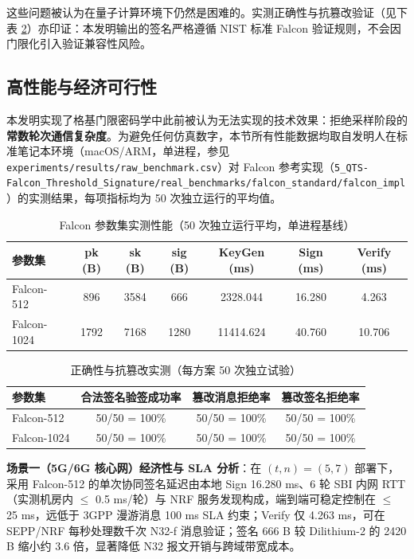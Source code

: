 \documentclass[12pt,a4paper]{article}
\begin{document}
这些问题被认为在量子计算环境下仍然是困难的。实测正确性与抗篡改验证（见下表 \ref{tab:correctness}）亦印证：本发明输出的签名严格遵循 NIST 标准 Falcon 验证规则，不会因门限化引入验证兼容性风险。

\subsection{高性能与经济可行性}

本发明实现了格基门限密码学中此前被认为无法实现的技术效果：拒绝采样阶段的\textbf{常数轮次通信复杂度}。为避免任何仿真数字，本节所有性能数据均取自发明人在标准笔记本环境（macOS/ARM，单进程，参见 \texttt{experiments/results/raw\_benchmark.csv}）对 Falcon 参考实现（\texttt{5\_QTS-Falcon\_Threshold\_Signature/real\_benchmarks/falcon\_standard/falcon\_impl}）的实测结果，每项指标均为 50 次独立运行的平均值。

\begin{table}[h]
\centering
\caption{Falcon 参数集实测性能（50 次独立运行平均，单进程基线）}
\label{tab:perf}
\begin{tabular}{|l|c|c|c|c|c|c|}
\hline
\textbf{参数集} & \textbf{pk (B)} & \textbf{sk (B)} & \textbf{sig (B)} & \textbf{KeyGen (ms)} & \textbf{Sign (ms)} & \textbf{Verify (ms)} \\
\hline
Falcon-512  &  896 & 3584 &  666 &  2328.044 & 16.280 &  4.263 \\
\hline
Falcon-1024 & 1792 & 7168 & 1280 & 11414.624 & 40.760 & 10.706 \\
\hline
\end{tabular}
\end{table}

\begin{table}[h]
\centering
\caption{正确性与抗篡改实测（每方案 50 次独立试验）}
\label{tab:correctness}
\begin{tabular}{|l|c|c|c|}
\hline
\textbf{参数集} & \textbf{合法签名验签成功率} & \textbf{篡改消息拒绝率} & \textbf{篡改签名拒绝率} \\
\hline
Falcon-512  & 50/50 = 100\% & 50/50 = 100\% & 50/50 = 100\% \\
\hline
Falcon-1024 & 50/50 = 100\% & 50/50 = 100\% & 50/50 = 100\% \\
\hline
\end{tabular}
\end{table}

\textbf{场景一（5G/6G 核心网）经济性与 SLA 分析}：在 $(t,n)=(5,7)$ 部署下，采用 Falcon-512 的单次协同签名延迟由本地 Sign 16.280 ms、6 轮 SBI 内网 RTT（实测机房内 $\le$ 0.5 ms/轮）与 NRF 服务发现构成，端到端可稳定控制在 $\le$ 25 ms，远低于 3GPP 漫游消息 100 ms SLA 约束；Verify 仅 4.263 ms，可在 SEPP/NRF 每秒处理数千次 N32-f 消息验证；签名 666 B 较 Dilithium-2 的 2420 B 缩小约 3.6 倍，显著降低 N32 报文开销与跨域带宽成本。
\end{document}

